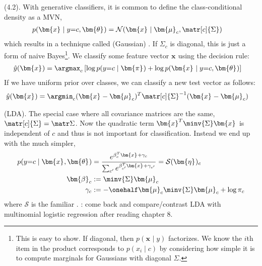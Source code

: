 \documentclass[11pt]{article}
\renewcommand\vec[2][]{\bm{#2}_{#1}}
\newcommand\myspace[1][]{\vspace{#1\bigskipamount}}
\newcommand\p{\Needspace{10\baselineskip} \noindent}
\begin{document}
\myspace
\p {} (4.2). With generative classifiers, it is common to define the class-conditional density as a MVN,
\begin{align}
	p(\vec x \mid y{=}c, \vec\theta) 
		&= \mathcal{N}(\vec x \mid \vec[c]{\mu}, \matr[c]{\Sigma})
\end{align}
which results in a technique called (Gaussian) . If $\Sigma_c$ is diagonal, this is just a form of naive Bayes\footnote{This is easy to show. If diagonal, then $p(\vec x \mid y)$ factorizes. We know the $i$th item in the product corresponds to $p(x_i \mid c)$ by considering how simple it is to compute marginals for Gaussians with diagonal $\Sigma$.}. We classify some feature vector $\vec x$ using the decision rule:
\begin{align}
	\hat{y}(\vec x)
		&= \argmax_c \left[ \log p(y{=}c \mid \vec\pi) + \log p(\vec x \mid y{=}c, \vec\theta ) \right]
\end{align}
If we have uniform prior over classes, we can classify a new test vector as follows:
\begin{align}
	\hat{y}(\vec x) 
		&= \argmin_c (\vec x - \vec[c]{\mu})^T \matr[c]{\Sigma}^{-1} (\vec x - \vec[c]{\mu})
\end{align}

\myspace
\p {} (LDA). The special case where all covariance matrices are the same, $\matr[c]{\Sigma} = \matr\Sigma$. Now the quadratic term $\vec{x}^T \minv{\Sigma} \vec x$ is independent of $c$ and thus is not important for classification. Instead we end up with the much simpler,
\begin{align}
	p(y{=}c \mid \vec x, \vec\theta)
		&= \frac{ e^{\beta_c^T \vec x + \gamma_c} }{  \sum_{c'} e^{\beta_{c'}^T \vec x + \gamma_{c'}  } }
		= \mathcal{S}(\vec\eta)_c \\
	\vec[c]{\beta}
		&:= \minv{\Sigma} \vec[c]{\mu} \\
	\gamma_c
		&:= - \onehalf \vec[c]{\mu}\minv{\Sigma} \vec[c]{\mu} + \log \pi_c 
\end{align}
where $\mathcal{S}$ is the familiar . : come back and compare/contrast LDA with multinomial logistic regression after reading chapter 8. 
\end{document}
